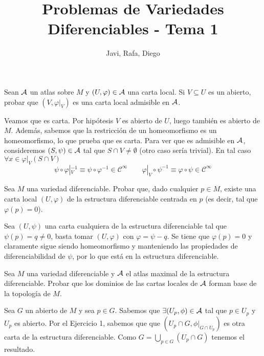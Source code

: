 \documentclass[twoside]{article}
\begin{document}
\title{Problemas de Variedades Diferenciables - Tema 1}
\author{Javi, Rafa, Diego}
\maketitle



\begin{ejercicio}{1}\label{1}
Sean $\mathcal{A}$ un atlas sobre $M$ y $(U,\varphi) \in \mathcal{A}$ una carta local. Si $V \subseteq U$ es un abierto, probar que
$(V, \varphi|_V )$ es una carta local admisible en $\mathcal{A}$.
\end{ejercicio}
\begin{solucion}
Veamos que es carta. Por hipótesis $V$ es abierto de $U$, luego también es abierto de $M$. Además, sabemos que la restricción de un homeomorfismo es un homeomorfismo, lo que prueba que es carta. Para ver que es admisible en $\mathcal{A}$, consideremos $(S,\psi)\in \mathcal{A}$ tal que $S\cap V \neq \emptyset$ (otro caso sería trivial). En tal caso $\forall x \in \varphi|_V (S\cap V)$
$$
\psi \circ \varphi|_V^{-1}\equiv \psi \circ \varphi^{-1} \in \mathcal{C}^\infty \qquad \varphi|_V \circ \psi^{-1}\equiv \varphi \circ \psi \in \mathcal{C}^\infty
$$

\end{solucion}

\newpage

\begin{ejercicio}{2}
Sea $M$ una variedad diferenciable. Probar que, dado cualquier $p \in M$, existe una carta local
$(U, \varphi)$ de la estructura diferenciable centrada en $p$ (es decir, tal que $\varphi(p) = 0$).
\end{ejercicio}
\begin{solucion}

Sea $(U,\psi)$ una carta cualquiera de la estructura diferenciable tal que $\psi(p)=q\neq 0$, basta tomar $(U,\varphi)$ con $\varphi=\psi-q$. Se tiene que $\varphi(p)=0$ y claramente sigue siendo homeomorfismo y manteniendo las propiedades de diferenciabilidad de $\psi$, por lo que está en la estructura diferenciable.
\end{solucion}

\newpage

\begin{ejercicio}{3}
Sea $M$ una variedad diferenciable y $\mathcal{A}$ el atlas maximal de la estructura diferenciable. Probar
que los dominios de las cartas locales de $\mathcal{A}$ forman base de la topología de $M$.
\end{ejercicio}
\begin{solucion}
Sea $G$ un abierto de $M$ y sea $p\in G$. Sabemos que $\exists (U_p,\phi) \in \mathcal{A}$ tal que $p\in U_p$ y $U_p$ es abierto. Por el Ejercicio 1, sabemos que que $(U_p\cap G, \phi|_{G\cap U_p})$ es otra carta de la estructura diferenciable. Como $G = \bigcup_{p\in G} (U_p\cap G)$ tenemos el resultado.
\end{solucion}
\end{document}
